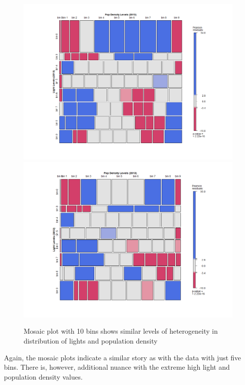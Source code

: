 \begin{figure}
    \centering
    \includegraphics[scale = 0.225]{Graphics/Total Mosaic Bins.png}
    \includegraphics[scale = 0.23]{Graphics/Slum Mosaic Bins.png}
    \caption{Mosaic plot with 10 bins shows similar levels of heterogeneity in distribution of lights and population density}
    \label{fig:binsMosaic}
\end{figure}

Again, the mosaic plots indicate a similar story as with the data with just five bins. There is, however, additional nuance with the extreme high light and population density values.


